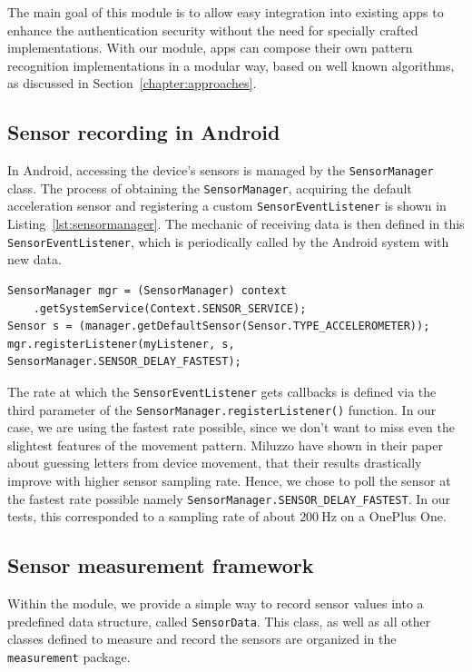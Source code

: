 The main goal of this module is to allow easy integration into existing apps to enhance the authentication security without the need for specially crafted implementations. With our module, apps can compose their own pattern recognition implementations in a modular way, based on well known algorithms, as discussed in Section~\ref{chapter:approaches}.

\subsection{Sensor recording in Android}\label{subsection:sensorrecording}
In Android, accessing the device's sensors is managed by the \lstinline$SensorManager$ class. The process of obtaining the \lstinline$SensorManager$, acquiring the default acceleration sensor and registering a custom \lstinline$SensorEventListener$ is shown in Listing~\ref{lst:sensormanager}. The mechanic of receiving data is then defined in this \lstinline$SensorEventListener$, which is periodically called by the Android system with new data.

\begin{lstlisting}[float,
caption={Obtaining the default acceleration sensor data in Android},
label={lst:sensormanager}]
SensorManager mgr = (SensorManager) context
    .getSystemService(Context.SENSOR_SERVICE);
Sensor s = (manager.getDefaultSensor(Sensor.TYPE_ACCELEROMETER));
mgr.registerListener(myListener, s, SensorManager.SENSOR_DELAY_FASTEST);
\end{lstlisting}

The rate at which the \lstinline$SensorEventListener$ gets callbacks is defined via the third parameter of the \lstinline$SensorManager.registerListener()$ function. In our case, we are using the fastest rate possible, since we don't want to miss even the slightest features of the movement pattern. Miluzzo \etal\cite{miluzzo2012tapprints} have shown in their paper about guessing letters from device movement, that their results drastically improve with higher sensor sampling rate. Hence, we chose to poll the sensor at the fastest rate possible namely \lstinline$SensorManager.SENSOR_DELAY_FASTEST$. In our tests, this corresponded to a sampling rate of about $\SI{200}{\hertz}$ on a OnePlus One.

\subsection{Sensor measurement framework}
Within the module, we provide a simple way to record sensor values into a predefined data structure, called \lstinline$SensorData$. This class, as well as all other classes defined to measure and record the sensors are organized in the \lstinline$measurement$ package.

